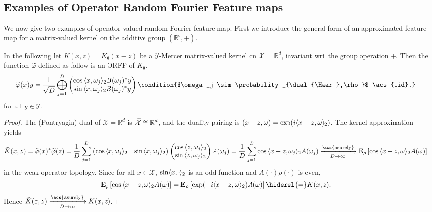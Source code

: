 \subsection{Examples of Operator Random Fourier Feature maps}
\label{subsec:examples_ORFF} We now give two examples of operator-valued random
Fourier feature map. First we introduce the general form of an approximated
feature map for a matrix-valued kernel on the additive group
$(\mathbb{R}^d,+)$.
\begin{example}
    \label{ex:additive_group} In the following let $K(x,z)=K_0(x-z)$ be a
    $\mathcal{Y}$-Mercer matrix-valued kernel on $\mathcal{X}=\mathbb{R}^d$,
    invariant \acs{wrt}~the group operation $+$. Then the function
    $\tildePhi{\omega}$ defined as follow is an \acl{ORFF} of $K_{0}$.
    \begin{dmath*}
        \tildePhi{\omega}(x)y=\frac{1}{\sqrt{D}}\Vect_{j=1}^D
        \begin{pmatrix}
            \cos{\inner{x,\omega_j}_2}B(\omega_j)^\adjoint y \\ 
            \sin{\inner{x,\omega_j}_2}B(\omega_j)^\adjoint y
        \end{pmatrix}
        \condition{$\omega_j \sim \probability_{\dual{\Haar},\rho}$
        \acs{iid}.}
    \end{dmath*}
    for all $y\in\mathcal{Y}$.
\end{example}
\begin{proof}
    The (Pontryagin) dual of $\mathcal{X}=\mathbb{R}^d$ is
    $\widehat{\mathcal{X}}\cong\mathbb{R}^d$, and the duality pairing is
    $(x-z,\omega)=\exp(i\langle x-z, \omega\rangle_2)$. The kernel
    approximation yields
    \begin{dmath*}
        \tilde{K}(x,z)=\tildePhi{\omega}(x)^\adjoint \tildePhi{\omega}(z)
        = \frac{1}{D} \sum_{j=1}^D \begin{pmatrix} \cos{\inner{x,\omega_j}_2} &
        \sin{\inner{x,\omega_j}_2}
        \end{pmatrix}\begin{pmatrix}\cos{\inner{z,\omega_j}_2} \\
        \sin{\inner{z,\omega_j}_2} \end{pmatrix} A(\omega_j)
        = \frac{1}{D} \sum_{j=1}^D \cos{\inner{x-z,\omega_j}_2}A(\omega_j) \\
        \converges{\acs{asurely}}{D \to \infty} \expectation_{\rho}
        \left[\cos{\inner{x - z,\omega}_2} A(\omega)\right]
    \end{dmath*}
    in the weak operator topology. Since for all $x\in\mathcal{X}$,
    $\sin\langle x, \cdot\rangle_2$ is an odd function and $A(\cdot)\rho(\cdot)$ is
    even,
    \begin{dmath*}
        \expectation_{\rho}\left[\cos{\inner{x-z,\omega}_2}A(\omega)\right]
        = \expectation_{\rho}
        \left[\exp(-i\inner{x-z,\omega}_2)A(\omega)\right]
        \hiderel{=}K(x,z).
    \end{dmath*}
    Hence $\tilde{K}(x,z)\converges{\acs{asurely}}{D\to\infty}K(x,z)$.
\end{proof}

